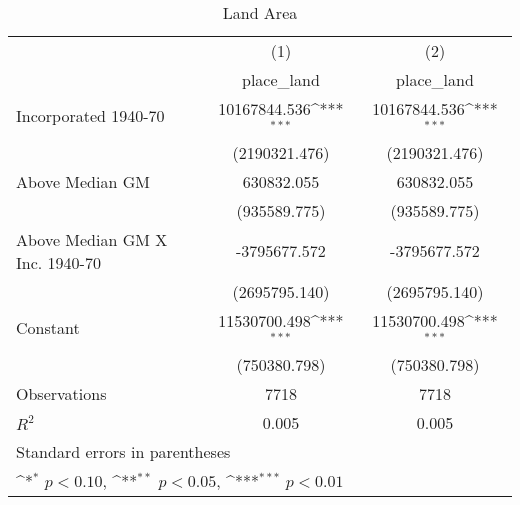 \begin{table}[htbp]\centering
\def\sym#1{\ifmmode^{#1}\else\(^{#1}\)\fi}
\caption{Land Area}
\begin{tabular}{l*{2}{c}}
\hline\hline
                    &\multicolumn{1}{c}{(1)}&\multicolumn{1}{c}{(2)}\\
                    &\multicolumn{1}{c}{place\_land}&\multicolumn{1}{c}{place\_land}\\
\hline
Incorporated 1940-70&10167844.536\sym{***}&10167844.536\sym{***}\\
                    &(2190321.476)         &(2190321.476)         \\
[1em]
Above Median GM     &  630832.055         &  630832.055         \\
                    &(935589.775)         &(935589.775)         \\
[1em]
Above Median GM X Inc. 1940-70&-3795677.572         &-3795677.572         \\
                    &(2695795.140)         &(2695795.140)         \\
[1em]
Constant            &11530700.498\sym{***}&11530700.498\sym{***}\\
                    &(750380.798)         &(750380.798)         \\
\hline
Observations        &        7718         &        7718         \\
\(R^{2}\)           &       0.005         &       0.005         \\
\hline\hline
\multicolumn{3}{l}{\footnotesize Standard errors in parentheses}\\
\multicolumn{3}{l}{\footnotesize \sym{*} \(p<0.10\), \sym{**} \(p<0.05\), \sym{***} \(p<0.01\)}\\
\end{tabular}
\end{table}
